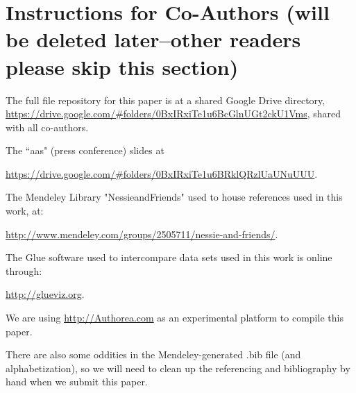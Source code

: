 \section{Instructions for Co-Authors (will be deleted later--other readers please skip this section)}

The full file repository for this paper is at a shared Google Drive directory,
\url{https://drive.google.com/#folders/0BxIRxiTe1u6BcGlnUGt2ckU1Vms},
shared with all co-authors.

The ``aas" (press conference) slides at

\url{https://drive.google.com/#folders/0BxIRxiTe1u6BRklQRzlUaUNuUUU}.

The Mendeley Library "NessieandFriends" used to house references used
in this work, at:

\url{http://www.mendeley.com/groups/2505711/nessie-and-friends/}.

The Glue software used to intercompare data sets used in this work is
online through: 

\url{http://glueviz.org}.

We are using \url{http://Authorea.com} as an experimental platform to compile this
paper. 

There are also some oddities in the Mendeley-generated .bib file (and alphabetization), so we will need to clean up the referencing and bibliography by hand when we submit this paper.
